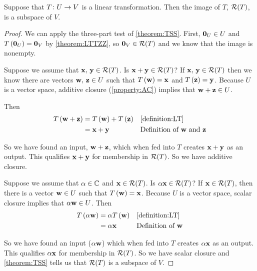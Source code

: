 \documentclass{ximera}
\begin{document}
\begin{theorem}
\label{theorem:RLTS}


Suppose that $T\colon U\rightarrow V$ is a linear transformation.  Then the image of $T$, $\mathcal{R}\!\left(T\right)$, is a subspace of $V$.





\begin{proof}
We can apply the three-part test of \ref{theorem:TSS}.  First, $\mathbf{0}_U\in U$ and $T\left(\mathbf{0}_U\right)=\mathbf{0}_V$ by \ref{theorem:LTTZZ}, so $\mathbf{0}_V\in\mathcal{R}\!\left(T\right)$ and we know that the image is nonempty.



Suppose we assume that $\mathbf{x},\,\mathbf{y}\in\mathcal{R}\!\left(T\right)$.  Is $\mathbf{x}+\mathbf{y}\in\mathcal{R}\!\left(T\right)$?  If $\mathbf{x},\,\mathbf{y}\in\mathcal{R}\!\left(T\right)$ then we know there are vectors $\mathbf{w},\,\mathbf{z}\in U$ such that $T\left(\mathbf{w}\right)=\mathbf{x}$ and $T\left(\mathbf{z}\right)=\mathbf{y}$.  Because $U$ is a vector space, additive closure (\ref{property:AC}) implies that $\mathbf{w}+\mathbf{z}\in U$.



Then
\begin{align*}
T\left(\mathbf{w}+\mathbf{z}\right)&=T\left(\mathbf{w}\right)+T\left(\mathbf{z}\right)&&\ref{definition:LT}\\
&=\mathbf{x}+\mathbf{y}&&\text{Definition of $\mathbf{w}$ and $\mathbf{z}$}
\end{align*}




So we have found an input, $\mathbf{w}+\mathbf{z}$, which when fed into $T$ creates $\mathbf{x}+\mathbf{y}$ as an output.  This qualifies $\mathbf{x}+\mathbf{y}$ for membership in $\mathcal{R}\!\left(T\right)$.  So we have additive closure.



Suppose we assume that $\alpha\in\mathbb{C}$ and $\mathbf{x}\in\mathcal{R}\!\left(T\right)$.  Is $\alpha\mathbf{x}\in\mathcal{R}\!\left(T\right)$?  If $\mathbf{x}\in\mathcal{R}\!\left(T\right)$, then there is a vector $\mathbf{w}\in U$ such that $T\left(\mathbf{w}\right)=\mathbf{x}$.  Because $U$ is a vector space, scalar closure implies that $\alpha\mathbf{w}\in U$.  Then
\begin{align*}
T\left(\alpha\mathbf{w}\right)&=\alpha T\left(\mathbf{w}\right)&&\ref{definition:LT}\\
&=\alpha\mathbf{x}&&\text{Definition of $\mathbf{w}$}
\end{align*}




So we have found an input ($\alpha\mathbf{w}$) which when fed into $T$ creates $\alpha\mathbf{x}$ as an output.  This qualifies $\alpha\mathbf{x}$ for membership in $\mathcal{R}\!\left(T\right)$.  So we have scalar closure and \ref{theorem:TSS} tells us that $\mathcal{R}\!\left(T\right)$ is a subspace of $V$.



\end{proof}
\end{theorem}
\end{document}

